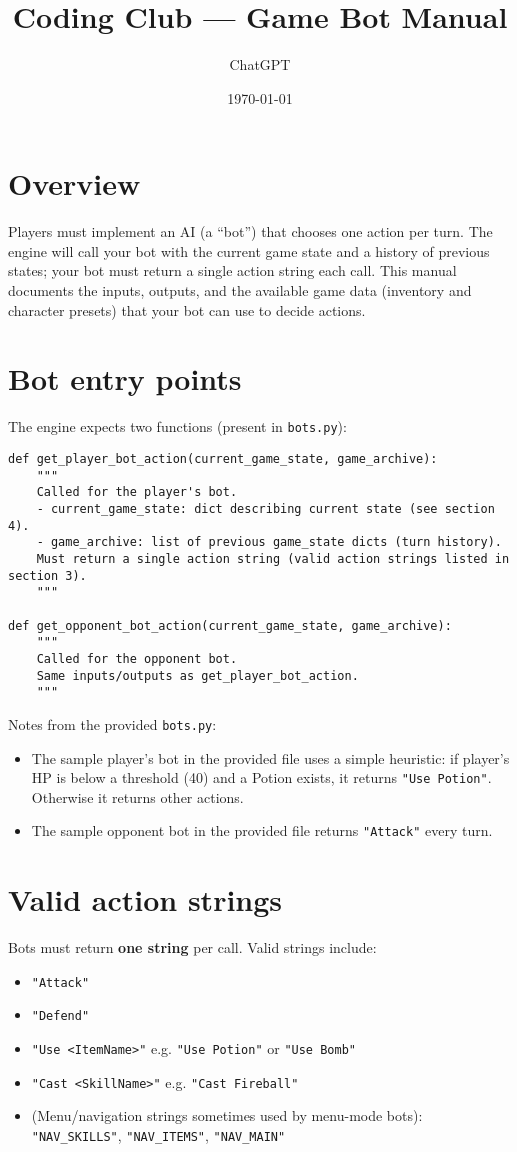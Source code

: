 \documentclass[11pt]{article}
\title{Coding Club — Game Bot Manual}
\author{ChatGPT}
\date{\today}
\begin{document}
\maketitle


\section{Overview}
Players must implement an AI (a ``bot'') that chooses one action per turn. The engine will call your bot with the current game state and a history of previous states; your bot must return a single action string each call. This manual documents the inputs, outputs, and the available game data (inventory and character presets) that your bot can use to decide actions.

\section{Bot entry points}
The engine expects two functions (present in \texttt{bots.py}):

\begin{lstlisting}
def get_player_bot_action(current_game_state, game_archive):
    """
    Called for the player's bot.
    - current_game_state: dict describing current state (see section 4).
    - game_archive: list of previous game_state dicts (turn history).
    Must return a single action string (valid action strings listed in section 3).
    """

def get_opponent_bot_action(current_game_state, game_archive):
    """
    Called for the opponent bot.
    Same inputs/outputs as get_player_bot_action.
    """
\end{lstlisting}

Notes from the provided \texttt{bots.py}:
\begin{itemize}
  \item The sample player's bot in the provided file uses a simple heuristic: if player's HP is below a threshold (40) and a Potion exists, it returns \texttt{"Use Potion"}. Otherwise it returns other actions.
  \item The sample opponent bot in the provided file returns \texttt{"Attack"} every turn.
\end{itemize}

\section{Valid action strings}
Bots must return \textbf{one string} per call. Valid strings include:
\begin{itemize}
  \item \texttt{"Attack"}
  \item \texttt{"Defend"}
  \item \texttt{"Use <ItemName>"} \quad e.g. \texttt{"Use Potion"} or \texttt{"Use Bomb"}
  \item \texttt{"Cast <SkillName>"} \quad e.g. \texttt{"Cast Fireball"}
  \item (Menu/navigation strings sometimes used by menu-mode bots): \texttt{"NAV\_SKILLS"}, \texttt{"NAV\_ITEMS"}, \texttt{"NAV\_MAIN"}
\end{itemize}
\end{document}
